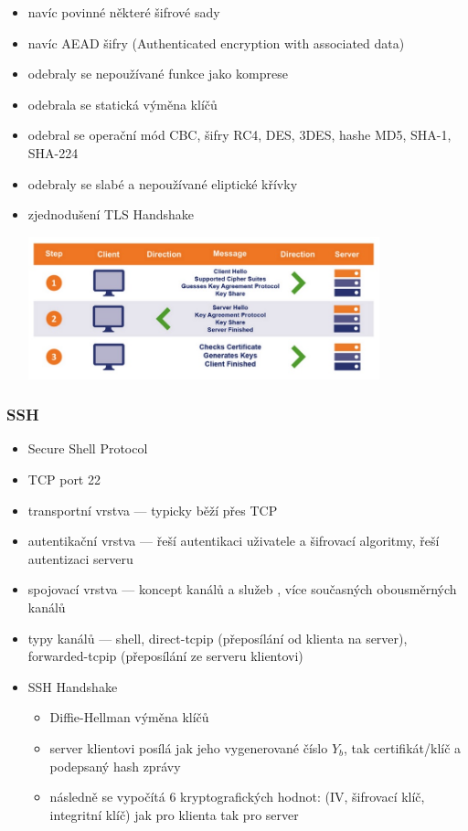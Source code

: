 \begin{itemize}
\begin{itemize}
		\item navíc povinné některé šifrové sady
		\item navíc AEAD šifry (Authenticated encryption with associated data)
		\item odebraly se nepoužívané funkce jako komprese
		\item odebrala se statická výměna klíčů
		\item odebral se operační mód CBC, šifry RC4, DES, 3DES, hashe MD5, SHA-1, SHA-224
		\item odebraly se slabé a nepoužívané eliptické křívky
		\item zjednodušení TLS Handshake
		
		\includegraphics[width=0.8\textwidth]{img/OB-12_2.jpg}
	\end{itemize}
\end{itemize}

\subsubsection*{SSH}
\begin{itemize}
	\item Secure Shell Protocol
	\item TCP port 22
	\item transportní vrstva --- typicky běží přes TCP
	\item autentikační vrstva --- řeší autentikaci uživatele a šifrovací algoritmy, řeší autentizaci serveru
	\item spojovací vrstva --- koncept kanálů a služeb , více současných obousměrných kanálů
	\item typy kanálů --- shell, direct-tcpip (přeposílání od klienta na server), forwarded-tcpip (přeposílání ze serveru klientovi)
	\item SSH Handshake
	\begin{itemize}
		\item Diffie-Hellman výměna klíčů
		\item server klientovi posílá jak jeho vygenerované číslo $Y_b$, tak certifikát/klíč a podepsaný hash zprávy
		\item následně se vypočítá 6 kryptografických hodnot: (IV, šifrovací klíč, integritní klíč) jak pro klienta tak pro server
	\end{itemize}
\end{itemize}